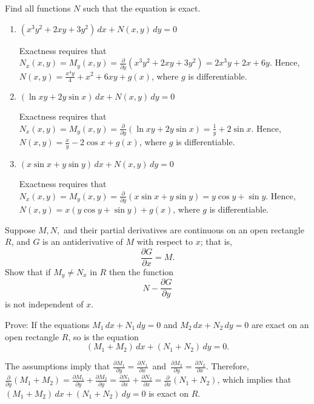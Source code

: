 \documentclass{ximera}
\begin{document}
\begin{problem}\label{exer:2.5.30}
Find all functions $N$ such that the  equation is exact.
\begin{enumerate}
\item %
$(x^3y^2+2xy+3y^2)\,dx+N(x,y)\,dy=0$



\begin{solution}
    Exactness requires that
$N_x(x,y)=M_y(x,y)=\frac{\partial}{\partial
y}(x^3y^2+2xy+3y^2)=2x^3y+2x+6y$.
 Hence, $N(x,y)=\frac{x^4y}{4}+x^2+6xy+g(x)$,
where $g$ is  differentiable.
\end{solution}

\item %
$(\ln xy+2y\sin x)\,dx+N(x,y)\,dy=0$



\begin{solution}
    Exactness requires that
$N_x(x,y)=M_y(x,y)=\frac{\partial}{\partial y}(\ln xy+2y\sin
x)=\frac{1}{y}+2\sin x$.
 Hence, $N(x,y)=\frac{x}{y}-2\cos x+g(x)$,
where $g$ is  differentiable.
\end{solution}
\item %
$(x\sin x+y\sin y)\,dx+N(x,y)\,dy=0$



\begin{solution}
    Exactness requires that
$N_x(x,y)=M_y(x,y)=\frac{\partial}{\partial y}(x\sin x+y\sin
y)=y\cos y+\sin y$.
 Hence, $N(x,y)=x(y\cos y+\sin y)+g(x)$,
where $g$ is  differentiable.
\end{solution}
\end{enumerate}


\end{problem}

\begin{problem}\label{exer:2.5.31}
Suppose $M,N,$ and their partial derivatives are continuous on
an open rectangle $R$, and $G$ is an antiderivative of $M$ with respect to $x$; that is,
$$
\frac{\partial G}{\partial x}=M.
$$
Show that if $M_y\ne N_x$ in $R$ then the function
$$
 N-\frac{\partial  G}{\partial y}
$$
is not independent of $x$.
\end{problem}

\begin{problem}\label{exer:2.5.32}
Prove:  If the equations $M_1\,dx+N_1\,dy=0$ and $M_2\,
dx+N_2\,dy=0$ are exact on an open rectangle $R$,  so is
the equation $$(M_1+M_2)\,dx+(N_1+N_2)\,dy=0.$$



\begin{solution}
The assumptions imply that
$\frac{\partial M_1}{\partial y}=\frac{\partial N_1}{\partial x}$\
and\ $\frac{\partial M_2}{\partial y}=\frac{\partial N_2}{\partial
x}$. Therefore, $\frac{\partial }{\partial
y}(M_1+M_2)=\frac{\partial M_1}{\partial y}+\frac{\partial
M_2}{\partial y}=\frac{\partial N_1}{\partial x}+\frac{\partial
N_2}{\partial x}=\frac{\partial }{\partial x}(N_1+N_2)$,
which implies that $(M_1+M_2)\,dx+(N_1+N_2)\,dy=0$ is exact on $R$.
\end{solution}
\end{problem}
\end{document}
